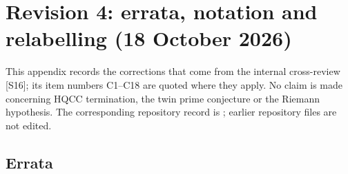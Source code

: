 \documentclass[11pt]{article}
\theoremstyle{definition}
\theoremstyle{plain}
\newcommand{\src}[1]{\textup{[S#1]}}
\begin{document}
\section{Revision 4: errata, notation and relabelling (18 October 2026)}\label{app:rev4}
This appendix records the corrections that come from the internal cross-review \src{16}; its item numbers C1--C18 are quoted where they apply. No claim is made
concerning HQCC termination, the twin prime conjecture or the Riemann hypothesis. The corresponding repository record is
; earlier repository files are not edited.

\subsection{Errata}
\end{document}
